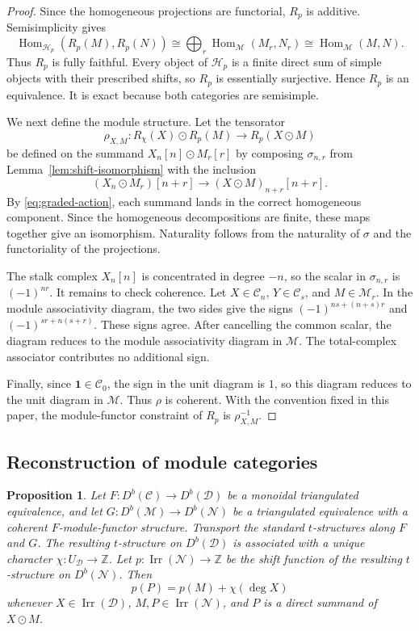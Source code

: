 \documentclass[11pt]{amsart}
\newcommand{\C}{\mathcal C}
\newcommand{\D}{\mathcal D}
\newcommand{\M}{\mathcal M}
\newcommand{\N}{\mathcal N}
\newcommand{\Hh}{\mathcal H}
\newcommand{\one}{\mathbf 1}
\newcommand{\Irr}{\operatorname{Irr}}
\DeclareMathOperator{\Hom}{Hom}
\newtheorem{proposition}[theorem]{Proposition}
\theoremstyle{definition}
\theoremstyle{remark}
\theoremstyle{plain}
\begin{document}
\begin{proof}
Since the homogeneous projections are functorial, $R_p$ is additive. Semisimplicity gives
\[
\Hom_{\Hh_p}(R_p(M),R_p(N))\cong\bigoplus_r\Hom_{\M}(M_r,N_r)\cong\Hom_{\M}(M,N).
\]
Thus $R_p$ is fully faithful. Every object of $\Hh_p$ is a finite direct sum of simple objects with their prescribed shifts, so $R_p$ is essentially surjective. Hence $R_p$ is an equivalence. It is exact because both categories are semisimple.

We next define the module structure. Let the tensorator 
\[
\rho_{X,M}: R_\chi(X)\odot R_p(M)\rightarrow R_p(X\odot M)
\]
be defined on the summand $X_n[n]\odot M_r[r]$ by composing $\sigma_{n,r}$ from Lemma~\ref{lem:shift-isomorphism} with the inclusion
\[
(X_n\odot M_r)[n+r]\rightarrow(X\odot M)_{n+r}[n+r].
\]
By \eqref{eq:graded-action}, each summand lands in the correct homogeneous component. Since the homogeneous decompositions are finite, these maps together give an isomorphism. Naturality follows from the naturality of $\sigma$ and the functoriality of the projections.

The stalk complex $X_n[n]$ is concentrated in degree $-n$, so the scalar in $\sigma_{n,r}$ is $(-1)^{nr}$. It remains to check coherence. Let $X\in\C_n$, $Y\in\C_s$, and $M\in\M_r$. In the module associativity diagram, the two sides give the signs $(-1)^{ns+(n+s)r}$ and $(-1)^{sr+n(s+r)}$. These signs agree. After cancelling the common scalar, the diagram reduces to the module associativity diagram in $\M$. The total-complex associator contributes no additional sign.

Finally, since $\one\in\C_0$, the sign in the unit diagram is $1$, so this diagram reduces to the unit diagram in $\M$. Thus $\rho$ is coherent. With the convention fixed in this paper, the module-functor constraint of $R_p$ is $\rho_{X,M}^{-1}$.
\end{proof}


\subsection{Reconstruction of module categories}\label{subsec:module-reconstruction}

\begin{proposition}\label{prop:transported-pair}
Let $F: D^b(\C)\to D^b(\D)$ be a monoidal triangulated equivalence, and let $G: D^b(\M)\to D^b(\N)$ be a triangulated equivalence with a coherent $F$-module-functor structure. Transport the standard $t$-structures along $F$ and $G$. The resulting $t$-structure on $D^b(\D)$ is associated with a unique character $\chi: U_{\D}\to\mathbb Z$. Let $p:\Irr(\N)\to\mathbb Z$ be the shift function of the resulting $t$-structure on $D^b(\N)$. Then
\[
p(P)=p(M)+\chi(\deg X)
\]
whenever $X\in\Irr(\D)$, $M,P\in\Irr(\N)$, and $P$ is a direct summand of $X\odot M$.
\end{proposition}
\end{document}
